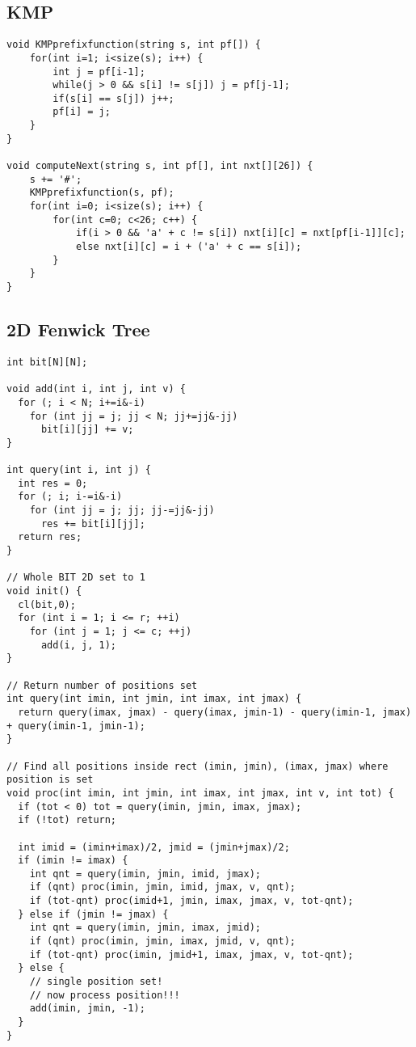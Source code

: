 \documentclass[12pt,a4paper,onesided]{article}
\begin{document}
\begin{multicols}{3}
\subsection{KMP}
\begin{lstlisting}
void KMPprefixfunction(string s, int pf[]) {
    for(int i=1; i<size(s); i++) {
        int j = pf[i-1];
        while(j > 0 && s[i] != s[j]) j = pf[j-1];
        if(s[i] == s[j]) j++;
        pf[i] = j;
    }
}

void computeNext(string s, int pf[], int nxt[][26]) {
    s += '#';
    KMPprefixfunction(s, pf);
    for(int i=0; i<size(s); i++) {
        for(int c=0; c<26; c++) {
            if(i > 0 && 'a' + c != s[i]) nxt[i][c] = nxt[pf[i-1]][c];
            else nxt[i][c] = i + ('a' + c == s[i]);
        }
    }
}
\end{lstlisting}


\subsection{2D Fenwick Tree}
\begin{lstlisting}
int bit[N][N];

void add(int i, int j, int v) {
  for (; i < N; i+=i&-i)
    for (int jj = j; jj < N; jj+=jj&-jj)
      bit[i][jj] += v;
}

int query(int i, int j) {
  int res = 0;
  for (; i; i-=i&-i)
    for (int jj = j; jj; jj-=jj&-jj)
      res += bit[i][jj];
  return res;
}

// Whole BIT 2D set to 1
void init() {
  cl(bit,0);
  for (int i = 1; i <= r; ++i)
    for (int j = 1; j <= c; ++j)
      add(i, j, 1);
}

// Return number of positions set
int query(int imin, int jmin, int imax, int jmax) {
  return query(imax, jmax) - query(imax, jmin-1) - query(imin-1, jmax) + query(imin-1, jmin-1);
}

// Find all positions inside rect (imin, jmin), (imax, jmax) where position is set
void proc(int imin, int jmin, int imax, int jmax, int v, int tot) {
  if (tot < 0) tot = query(imin, jmin, imax, jmax);
  if (!tot) return;

  int imid = (imin+imax)/2, jmid = (jmin+jmax)/2;
  if (imin != imax) {
    int qnt = query(imin, jmin, imid, jmax);
    if (qnt) proc(imin, jmin, imid, jmax, v, qnt);
    if (tot-qnt) proc(imid+1, jmin, imax, jmax, v, tot-qnt);
  } else if (jmin != jmax) {
    int qnt = query(imin, jmin, imax, jmid);
    if (qnt) proc(imin, jmin, imax, jmid, v, qnt);
    if (tot-qnt) proc(imin, jmid+1, imax, jmax, v, tot-qnt);
  } else {
    // single position set!
    // now process position!!!
    add(imin, jmin, -1);
  }
}
\end{lstlisting}



\end{multicols}
\end{document}
